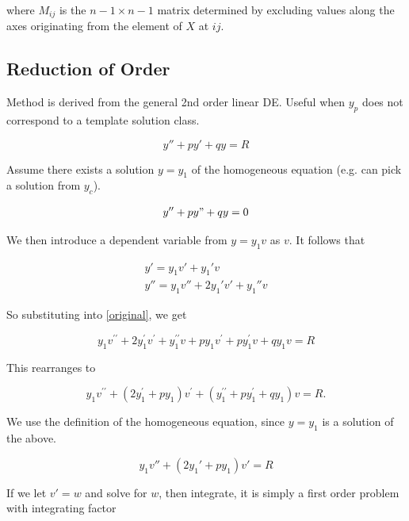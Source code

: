 where $M_{ij}$ is the $n-1\times n-1$ matrix determined by excluding values along the axes originating from the element of $X$ at $ij$.

\subsection{Reduction of Order}

Method is derived from the general 2nd order linear DE. Useful when $y_p$ does not correspond to a template solution class.

\begin{equation}
    y''+py'+qy=R\label{original}
\end{equation}

Assume there exists a solution $y=y_1$ of the homogeneous equation (e.g. can pick a solution from $y_c$).

\begin{eqnarray}
    y''+py"+qy=0
\end{eqnarray}

We then introduce a dependent variable from $y=y_1v$ as $v$. It follows that

\begin{eqnarray}
    y'=y_1v'+y_1'v\\
    y''=y_1v''+2y_1'v'+y_1''v
\end{eqnarray}

So substituting into \ref{original}, we get

\begin{equation}
    y_{1} v^{\prime \prime}+2 y_{1}^{\prime} v^{\prime}+y_{1}^{\prime \prime} v+p y_{1} v^{\prime}+p y_{1}^{\prime} v+q y_{1} v=R
\end{equation}

This rearranges to

\begin{equation}
    y_{1} v^{\prime \prime}+\left(2 y_{1}^{\prime}+p y_{1}\right) v^{\prime}+\left(y_{1}^{\prime \prime}+p y_{1}^{\prime}+q y_{1}\right) v=R .
\end{equation}

We use the definition of the homogeneous equation, since $y=y_1$ is a solution of the above.

\begin{equation}
    y_1v''+(2y_1'+py_1)v'=R
\end{equation}

If we let $v'=w$ and solve for $w$, then integrate, it is simply a first order problem with integrating factor

